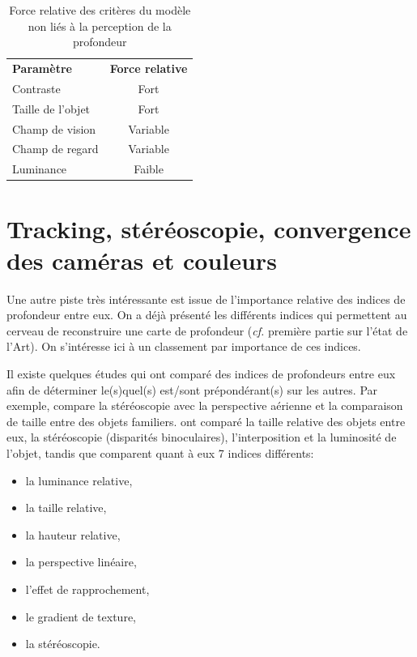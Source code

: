 \begin{table}[h]	
	\centering
	\caption{Force relative des critères du modèle non liés à la perception de la profondeur}
	\label{tab:ponderation_non_profondeur}
	\small
	\begin{tabular}{lc}
		\multicolumn{1}{l}{\bfseries Paramètre} & \multicolumn{1}{c}{\bfseries Force relative}\\		
		Contraste & Fort\\
		Taille de l'objet & Fort\\
		Champ de vision & Variable\\
		Champ de regard & Variable\\
		Luminance & Faible\\
	\end{tabular}
\end{table}

\section{Tracking, stéréoscopie, convergence des caméras et couleurs}
\par Une autre piste très intéressante est issue de l'importance relative des indices de profondeur entre eux. On a déjà présenté les différents indices qui permettent au cerveau de reconstruire une carte de profondeur (\textit{cf.} première partie sur l'état de l'Art). On s'intéresse ici à un classement par importance de ces indices.

\par Il existe quelques études qui ont comparé des indices de profondeurs entre eux afin de déterminer le(s)quel(s) est/sont prépondérant(s) sur les autres. Par exemple, \citep{mazur_relative_1990} compare la stéréoscopie avec la perspective aérienne et la comparaison de taille entre des objets familiers. \citep{reinhart_comparison_1990} ont comparé la taille relative des objets entre eux, la stéréoscopie (disparités binoculaires), l'interposition et la luminosité de l'objet, tandis que \citep{surdick_relevant_1994, surdick_perception_1997} comparent quant à eux 7 indices différents:

\begin{itemize}
	\item la luminance relative,
	\item la taille relative,
	\item la hauteur relative,
	\item la perspective linéaire,
	\item l'effet de rapprochement,
	\item le gradient de texture,
	\item la stéréoscopie.
\end{itemize}

